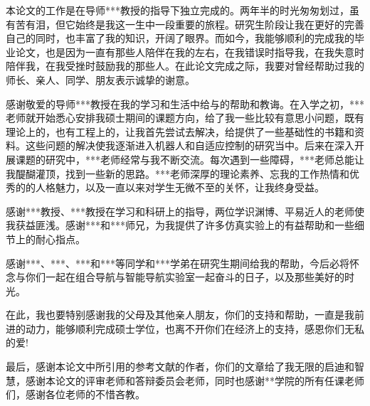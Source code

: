 
\begin{thanks}

本论文的工作是在导师***教授的指导下独立完成的。两年半的时光匆匆划过，虽有苦有泪，但它始终是我这一生中一段重要的旅程。研究生阶段让我在更好的完善自己的同时，也丰富了我的知识，开阔了眼界。而如今，我能够顺利的完成我的毕业论文，也是因为一直有那些人陪伴在我的左右，在我错误时指导我，在我失意时陪伴我，在我受挫时鼓励我的那些人。在此论文完成之际，我要对曾经帮助过我的师长、亲人、同学、朋友表示诚挚的谢意。

感谢敬爱的导师***教授在我的学习和生活中给与的帮助和教诲。在入学之初，***老师就开始悉心安排我硕士期间的课题方向，给了我一些比较有意思小问题，既有理论上的，也有工程上的，让我首先尝试去解决，给提供了一些基础性的书籍和资料。这些问题的解决使我逐渐进入机器人和自适应控制的研究当中。后来在深入开展课题的研究中，***老师经常与我不断交流。每次遇到一些障碍，***老师总能让我醍醐灌顶，找到一些新的思路。***老师深厚的理论素养、忘我的工作热情和优秀的的人格魅力，以及一直以来对学生无微不至的关怀，让我终身受益。

感谢***教授、***教授在学习和科研上的指导，两位学识渊博、平易近人的老师使我获益匪浅。感谢***和***师兄，为我提供了许多仿真实验上的有益帮助和一些细节上的耐心指点。

感谢***、***、***和***等同学和***学弟在研究生期间给我的帮助，今后必将怀念与你们一起在组合导航与智能导航实验室一起奋斗的日子，以及那些美好的时光。

在此，我也要特别感谢我的父母及其他亲人朋友，你们的支持和帮助，一直是我前进的动力，能够顺利完成硕士学位，也离不开你们在经济上的支持，感恩你们无私的爱!

最后，感谢本论文中所引用的参考文献的作者，你们的文章给了我无限的启迪和智慧，感谢本论文的评审老师和答辩委员会老师，同时也感谢**学院的所有任课老师们，感谢各位老师的不惜吝教。

\end{thanks}
